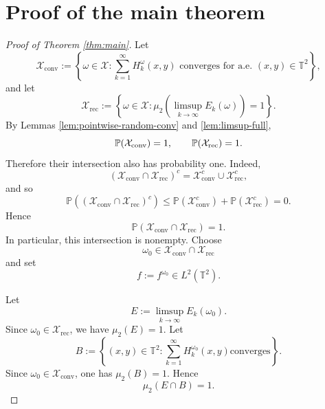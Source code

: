 \documentclass[11pt]{amsart}
\numberwithin{equation}{section}
\begin{document}
\section{Proof of the main theorem}

\begin{proof}[Proof of Theorem \protect\ref{thm:main}]
Let 
\begin{equation*}
\mathcal{X}_{\mathrm{conv}}:=\left\{ \omega \in \mathcal{X}%
:\sum_{k=1}^{\infty }H_{k}^{\omega }(x,y)\text{ converges for a.e. }(x,y)\in 
\mathbb{T}^{2}\right\} ,
\end{equation*}%
and let 
\begin{equation*}
\mathcal{X}_{\mathrm{rec}}:=\left\{ \omega \in \mathcal{X}:\mu _{2}\left(
\limsup_{k\rightarrow \infty }E_{k}(\omega )\right) =1\right\} .
\end{equation*}%
By Lemmas \ref{lem:pointwise-random-conv} and \ref{lem:limsup-full}, 
\begin{equation*}
\mathbb{P}(\mathcal{X}_{\mathrm{conv}})=1,\qquad \mathbb{P}(\mathcal{X}_{%
\mathrm{rec}})=1.
\end{equation*}%
Therefore their intersection also has probability one. Indeed, 
\begin{equation*}
(\mathcal{X}_{\mathrm{conv}}\cap \mathcal{X}_{\mathrm{rec}})^{c}=\mathcal{X}%
_{\mathrm{conv}}^{c}\cup \mathcal{X}_{\mathrm{rec}}^{c},
\end{equation*}%
and so 
\begin{equation*}
\mathbb{P}\left( (\mathcal{X}_{\mathrm{conv}}\cap \mathcal{X}_{\mathrm{rec}})^{c}\right) \leq \mathbb{P}(\mathcal{X}_{\mathrm{conv}}^{c})+\mathbb{P}(%
\mathcal{X}_{\mathrm{rec}}^{c})=0.
\end{equation*}%
Hence 
\begin{equation*}
\mathbb{P}(\mathcal{X}_{\mathrm{conv}}\cap \mathcal{X}_{\mathrm{rec}})=1.
\end{equation*}%
In particular, this intersection is nonempty. Choose 
\begin{equation*}
\omega _{0}\in \mathcal{X}_{\mathrm{conv}}\cap \mathcal{X}_{\mathrm{rec}}
\end{equation*}%
and set 
\begin{equation*}
f:=f^{\omega _{0}}\in L^{2}(\mathbb{T}^{2}).
\end{equation*}

Let 
\begin{equation*}
E:=\limsup_{k\to\infty}E_k(\omega_0).
\end{equation*}
Since $\omega_0\in\mathcal{X}_{\mathrm{rec}}$, we have $\mu_2(E)=1$. Let 
\begin{equation*}
B:=\left\{(x,y)\in\mathbb{T}^2: \sum_{k=1}^{\infty}H_k^{\omega_0}(x,y)\text{
converges}\right\}.
\end{equation*}
Since $\omega_0\in\mathcal{X}_{\mathrm{conv}}$, one has $\mu_2(B)=1$. Hence 
\begin{equation*}
\mu_2(E\cap B)=1.
\end{equation*}


\end{proof}
\end{document}
